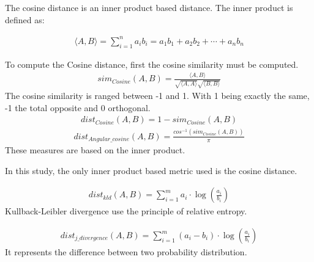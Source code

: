 \begin{definition}
  \label{def:cosine_dist}
  The cosine distance is an inner product based distance.
  The inner product is defined as:

  \begin{gather*}
    \langle A, B \rangle = \sum_{i=1}^{n} a_i b_i = a_1 b_1 + a_2 b_2 + \cdots + a_n b_n
  \end{gather*}

  To compute the Cosine distance, first the cosine similarity must be computed.
  \begin{gather*}
    sim_{Cosine}(A, B) = \frac{\langle A, B \rangle}{\sqrt{\langle A , A \rangle}\sqrt{\langle B, B \rangle}}
  \end{gather*}
  The cosine similarity is ranged between -1 and 1.
  With 1 being exactly the same, -1 the total opposite and 0 orthogonal.
  \begin{gather*}
    dist_{Cosine}(A, B) = 1 - sim_{Cosine}(A, B)
  \end{gather*}
  \begin{gather*}
    dist_{Angular\_cosine}(A, B) = \frac{cos^{-1}\left( sim_{Cosine}(A, B) \right)}{\pi}
  \end{gather*}
  These measures are based on the inner product.

  In this study, the only inner product based metric used is the cosine distance.
\end{definition}

\begin{definition}
  \begin{gather*}
    dist_{kld}(A, B) = \sum_{i=1}^{m} a_i \cdot \log(\frac{a_i}{b_i})
  \end{gather*}
  Kullback-Leibler divergence use the principle of relative entropy.
\end{definition}

\begin{definition}
  \begin{gather*}
    dist_{j\_divergence}(A, B) = \sum_{i=1}^{m} (a_i - b_i) \cdot \log(\frac{a_i}{b_i})
  \end{gather*}
  It represents the difference between two probability distribution.
\end{definition}
